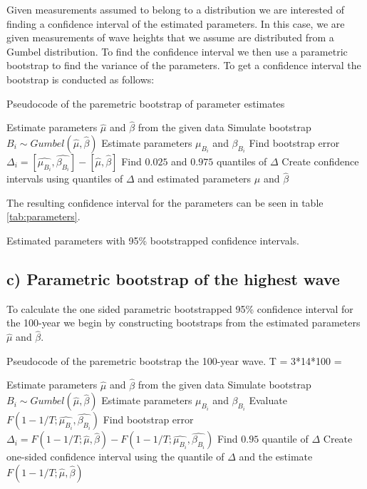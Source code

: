 \documentclass[a4paper]{article}
\begin{document}
Given measurements assumed to belong to a distribution we are interested of finding a confidence interval of the estimated parameters. In this case, we are given measurements of wave heights that we assume are distributed from a Gumbel distribution. To find the confidence interval we then use a parametric bootstrap to find the variance of the parameters. To get a confidence interval the bootstrap is conducted as follows:

\begin{algorithm}
    \caption{Pseudocode of the paremetric bootstrap of parameter estimates}
    \begin{algorithmic}
        \State Estimate parameters $\hat{\mu}$ and $\hat{\beta}$ from the given data
        \State Simulate bootstrap $B_i \sim Gumbel(\hat{\mu}, \hat{\beta})$
        \State Estimate parameters $\mu_{B_i}$ and $\beta_{B_i}$
        \State Find bootstrap error $\Delta_i = [\hat{\mu_{B_i}}, \hat{\beta_{B_i}}] - [\hat{\mu}, \hat{\beta}]$
        \EndFor
        \State Find $0.025$ and $0.975$ quantiles of $\Delta$
        \State Create confidence intervals using quantiles of $\Delta$ and estimated parameters $\hat{\mu}$ and $\hat{\beta}$
    \end{algorithmic}
\end{algorithm}

The resulting confidence interval for the parameters can be seen in table \ref{tab:parameters}.

\begin{table}[H]
    \centering
    \caption{Estimated parameters with 95\% bootstrapped confidence intervals.}
    \label{tab:parameters}
    
\end{table}

\subsection*{c) Parametric bootstrap of the highest wave}

To calculate the one sided parametric bootstrapped 95\% confidence interval for the 100-year we begin by constructing bootstraps from the estimated parameters $\hat{\mu}$ and $\hat{\beta}$. 

\begin{algorithm}
    \caption{Pseudocode of the paremetric bootstrap the 100-year wave. T = 3*14*100 = }
    \begin{algorithmic}
        \State Estimate parameters $\hat{\mu}$ and $\hat{\beta}$ from the given data
        \State Simulate bootstrap $B_i \sim Gumbel(\hat{\mu}, \hat{\beta})$
        \State Estimate parameters $\mu_{B_i}$ and $\beta_{B_i}$
        \State Evaluate $F(1-1/T; \hat{\mu_{B_i}}, \hat{\beta_{B_i}})$
        \State Find bootstrap error $\Delta_i = F(1-1/T; \hat{\mu}, \hat{\beta}) - F(1-1/T; \hat{\mu_{B_i}}, \hat{\beta_{B_i}})$
        \EndFor
        \State Find $0.95$ quantile of $\Delta$
        \State Create one-sided confidence interval using the quantile of $\Delta$ and the estimate $F(1-1/T; \hat{\mu}, \hat{\beta})$
    \end{algorithmic}
\end{algorithm}
\end{document}
